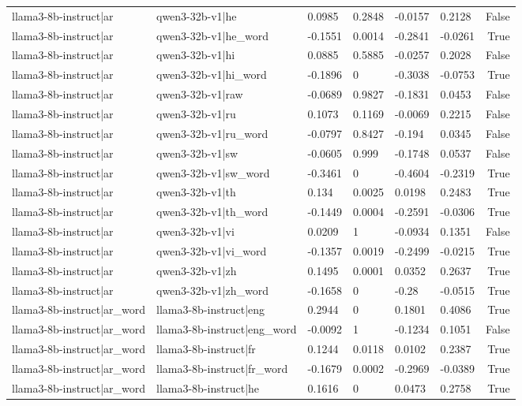 \begin{table}
\begin{tabular}{llllllr}
llama3-8b-instruct|ar & qwen3-32b-v1|he & 0.0985 & 0.2848 & -0.0157 & 0.2128 & False \\
llama3-8b-instruct|ar & qwen3-32b-v1|he_word & -0.1551 & 0.0014 & -0.2841 & -0.0261 & True \\
llama3-8b-instruct|ar & qwen3-32b-v1|hi & 0.0885 & 0.5885 & -0.0257 & 0.2028 & False \\
llama3-8b-instruct|ar & qwen3-32b-v1|hi_word & -0.1896 & 0 & -0.3038 & -0.0753 & True \\
llama3-8b-instruct|ar & qwen3-32b-v1|raw & -0.0689 & 0.9827 & -0.1831 & 0.0453 & False \\
llama3-8b-instruct|ar & qwen3-32b-v1|ru & 0.1073 & 0.1169 & -0.0069 & 0.2215 & False \\
llama3-8b-instruct|ar & qwen3-32b-v1|ru_word & -0.0797 & 0.8427 & -0.194 & 0.0345 & False \\
llama3-8b-instruct|ar & qwen3-32b-v1|sw & -0.0605 & 0.999 & -0.1748 & 0.0537 & False \\
llama3-8b-instruct|ar & qwen3-32b-v1|sw_word & -0.3461 & 0 & -0.4604 & -0.2319 & True \\
llama3-8b-instruct|ar & qwen3-32b-v1|th & 0.134 & 0.0025 & 0.0198 & 0.2483 & True \\
llama3-8b-instruct|ar & qwen3-32b-v1|th_word & -0.1449 & 0.0004 & -0.2591 & -0.0306 & True \\
llama3-8b-instruct|ar & qwen3-32b-v1|vi & 0.0209 & 1 & -0.0934 & 0.1351 & False \\
llama3-8b-instruct|ar & qwen3-32b-v1|vi_word & -0.1357 & 0.0019 & -0.2499 & -0.0215 & True \\
llama3-8b-instruct|ar & qwen3-32b-v1|zh & 0.1495 & 0.0001 & 0.0352 & 0.2637 & True \\
llama3-8b-instruct|ar & qwen3-32b-v1|zh_word & -0.1658 & 0 & -0.28 & -0.0515 & True \\
llama3-8b-instruct|ar_word & llama3-8b-instruct|eng & 0.2944 & 0 & 0.1801 & 0.4086 & True \\
llama3-8b-instruct|ar_word & llama3-8b-instruct|eng_word & -0.0092 & 1 & -0.1234 & 0.1051 & False \\
llama3-8b-instruct|ar_word & llama3-8b-instruct|fr & 0.1244 & 0.0118 & 0.0102 & 0.2387 & True \\
llama3-8b-instruct|ar_word & llama3-8b-instruct|fr_word & -0.1679 & 0.0002 & -0.2969 & -0.0389 & True \\
llama3-8b-instruct|ar_word & llama3-8b-instruct|he & 0.1616 & 0 & 0.0473 & 0.2758 & True \\

\end{tabular}
\end{table}
